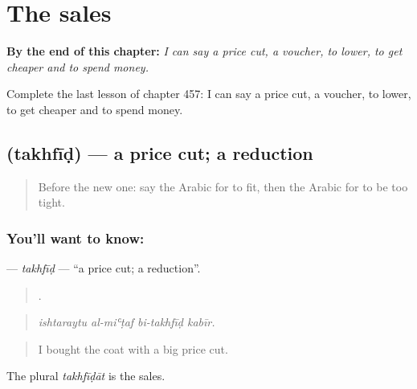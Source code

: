 
\chapter{The sales}
\label{ch:ar-the-sales}

\begin{chapteropening}
\textbf{By the end of this chapter:} \emph{I can say a price cut, a voucher, to lower, to get cheaper and to spend money.}

Complete the last lesson of chapter 457: I can say a price cut, a voucher, to lower, to get cheaper and to spend money.
\end{chapteropening}

\section[\texorpdfstring{\ar{تخفيض} (takhfīḍ)}{تخفيض (takhfīḍ)}]{ (takhfīḍ) — a price cut; a reduction}

\label{lesson:AR-C457-takhfid}



\begin{quote}
Before the new one: say the Arabic for to fit, then the Arabic for to be too tight.
\end{quote}

\subsection*{You'll want to know: }
\textbf{} — \emph{takhfīḍ} — \textquotedblleft{}a price cut; a reduction\textquotedblright{}.

\begin{quote}
   .
\end{quote}

\begin{quote}
\emph{ishtaraytu al-miʿṭaf bi-takhfīḍ kabīr.}
\end{quote}

\begin{quote}
I bought the coat with a big price cut.
\end{quote}

The plural \emph{takhfīḍāt} is the sales.

